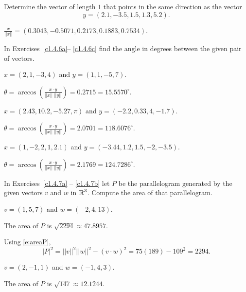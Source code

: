 \documentclass{ximera}
\begin{document}
\begin{exercise} \label{c1.4.5b}
Determine the vector of length $1$ that points in the same direction
as the vector
\[
y=(2.1,-3.5,1.5,1.3,5.2).
\]

\begin{solution}

$\frac{x}{||x||} = (0.3043, -0.5071, 0.2173, 0.1883, 0.7534)$.

\end{solution}
\end{exercise}

\noindent In Exercises~\ref{c1.4.6a}-- \ref{c1.4.6c} find the angle in
degrees between the given pair of vectors.
\begin{exercise} \label{c1.4.6a}
$x=(2,1,-3,4)$ and $y=(1,1,-5,7)$.

\begin{solution}
$\theta =
\arccos \left(\frac{x \cdot y}{||x||\;||y||}\right) =
0.2715 = 15.5570^\circ$.

\end{solution}
\end{exercise}
\begin{exercise} \label{c1.4.6b}
$x=(2.43, 10.2,-5.27,\pi)$ and $y= (-2.2,0.33,4,-1.7)$.

\begin{solution}
$\theta =
\arccos \left(\frac{x \cdot y}{||x||\;||y||}\right) =
2.0701 = 118.6076^\circ$.

\end{solution}
\end{exercise}
\begin{exercise} \label{c1.4.6c}
$x=(1,-2,2,1,2.1)$ and $y=(-3.44,1.2,1.5,-2,-3.5)$.

\begin{solution}
$\theta =
\arccos \left(\frac{x \cdot y}{||x||\;||y||}\right) =
2.1769 = 124.7286^\circ$.

\end{solution}
\end{exercise}

\noindent In Exercises~\ref{c1.4.7a} -- \ref{c1.4.7b} let $P$ be the 
parallelogram generated by the given vectors $v$ and $w$ in $\mbox{$\Bbb{R}$}^3$.  
Compute the area of that parallelogram.
\begin{exercise} \label{c1.4.7a}
$v=(1,5,7)$ and $w=(-2,4,13)$.

\begin{solution}
\ans The area of $P$ is $\sqrt{2294} \approx 47.8957$.

\soln Using \eqref{e:areaP},
\[
|P|^2 = ||v||^2||w||^2 - (v \cdot w)^2 = 75(189) - 109^2 = 2294.
\]

\end{solution}
\end{exercise}
\begin{exercise} \label{c1.4.7b}
$v=(2,-1,1)$ and $w=(-1,4,3)$.

\begin{solution}
\ans The area of $P$ is $\sqrt{147} \approx 12.1244$.



\end{solution}
\end{exercise}
\end{document}
